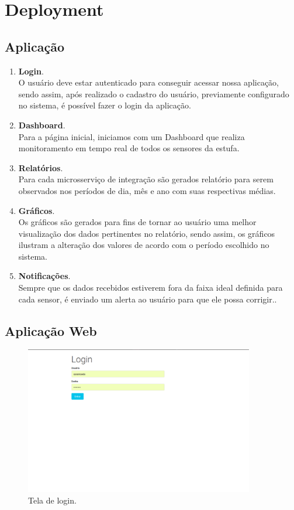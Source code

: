 \section{Deployment}

\subsection{Aplicação}

\begin{enumerate}
	\item \textbf{Login}. \\ O usuário deve estar autenticado para conseguir acessar nossa aplicação, sendo assim, após realizado o cadastro do usuário, previamente configurado no sistema, é possível fazer o login da aplicação.
	
	\item \textbf{Dashboard}. \\ Para a página inicial, iniciamos com um Dashboard que realiza monitoramento em tempo real de todos os sensores da estufa.
	
	\item \textbf{Relatórios}. \\ Para cada microsserviço de integração são gerados relatório para serem observados nos períodos de dia, mês e ano com suas respectivas médias.
	
	\item \textbf{Gráficos}. \\ Os gráficos são gerados para fins de tornar ao usuário uma melhor visualização dos dados pertinentes no relatório, sendo assim, os gráficos ilustram a alteração dos valores de acordo com o período escolhido no sistema.

	\item \textbf{Notificações}. \\ Sempre que os dados recebidos estiverem fora da faixa ideal definida para cada sensor, é enviado um alerta ao usuário para que ele possa corrigir..
	
\end{enumerate}

\subsection{Aplicação Web}

	\begin{figure}[H]
		\centering
		\includegraphics[width=10cm]{figuras/login.png}
		\caption{Tela de login.}
		\label{loginwebbapp}
	\end{figure}
	

